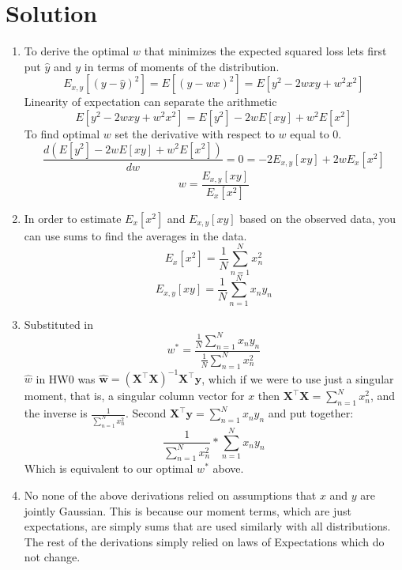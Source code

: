 \documentclass[submit]{harvardml}
\newenvironment{solution}
  {\color{blue}\section*{Solution}}
{}
\begin{document}
\newpage
\begin{solution}
	\begin{enumerate}
	    \item To derive the optimal $w$ that minimizes the expected        squared loss lets first put $\hat{y}$ and $y$ in terms of          moments of the distribution. 
            $$E_{x,y}[(y-\hat{y})^2]=E[(y-wx)^2]=E[y^2-2wxy+w^2x^2]$$
            Linearity of expectation can separate the arithmetic
            $$E[y^2-2wxy+w^2x^2]= E[y^2]-2wE[xy]+w^2E[x^2]$$
            To find optimal $w$ set the derivative with respect to $w$ equal to 0.
            $$\frac{d(E[y^2]-2wE[xy]+w^2E[x^2])}{dw} = 0 = -2E_{x,y}[xy]+2wE_x[x^2]$$
            $$w = \frac{E_{x,y}[xy]}{E_x[x^2]}$$

            \item In order to estimate $E_x[x^2]$ and $E_{x,y}[xy]$ based on the observed data, you can use sums to find the averages in the data. 
            $$E_x[x^2] = \frac{1}{N}\sum_{n=1}^N x_n^2$$
            $$E_{x,y}[xy] = \frac{1}{N}\sum_{n=1}^N x_ny_n$$

            \item Substituted in $$w^* = \frac{\frac{1}{N}\sum_{n=1}^N x_ny_n}{\frac{1}{N}\sum_{n=1}^N x_n^2}$$
            $\hat{w}$ in HW0 was $\bm{\hat w} = (\bm X^\top \bm X)^{-1}\bm X^\top \bm y$, which if we were to use just a singular moment, that is, a singular column vector for $x$ then $\bm X^\top \bm X = \sum_{n=1}^N x_n^2$, and the inverse is $\frac{1}{\sum_{n=1}^N x_n^2}$. Second $\bm X^\top \bm y = \sum_{n=1}^N x_ny_n$ and put together: 
            $$\frac{1}{\sum_{n=1}^N x_n^2} * \sum_{n=1}^N x_ny_n$$
            Which is equivalent to our optimal $w^*$ above.

            \item No none of the above derivations relied on assumptions that $x$ and $y$ are jointly Gaussian. This is because our moment terms, which are just expectations, are simply sums that are used similarly with all distributions. The rest of the derivations simply relied on laws of Expectations which do not change.  
	\end{enumerate}
\end{solution}

\end{document}
